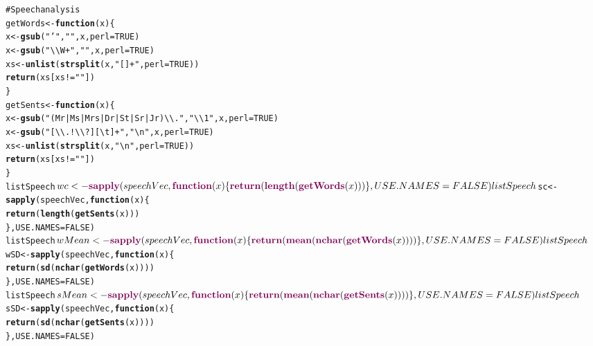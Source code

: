 \documentclass{article}\usepackage{graphicx, color}
\makeatletter
\newcommand{\hlfunctioncall}[1]{\textcolor[rgb]{0.501960784313725,0,0.329411764705882}{\textbf{#1}}}%
\newcommand{\hlstring}[1]{\textcolor[rgb]{0.6,0.6,1}{#1}}%
\newcommand{\hlcomment}[1]{\textcolor[rgb]{0.180392156862745,0.6,0.341176470588235}{#1}}%
\newenvironment{kframe}{%
 \def\at@end@of@kframe{}%
 \ifinner\ifhmode%
  \def\at@end@of@kframe{\end{minipage}}%
  \begin{minipage}{\columnwidth}%
 \fi\fi%
 \def\FrameCommand##1{\hskip\@totalleftmargin \hskip-\fboxsep
 \colorbox{shadecolor}{##1}\hskip-\fboxsep
     \hskip-\linewidth \hskip-\@totalleftmargin \hskip\columnwidth}%
 \MakeFramed {\advance\hsize-\width
   \@totalleftmargin\z@ \linewidth\hsize
   \@setminipage}}%
 {\par\unskip\endMakeFramed%
 \at@end@of@kframe}
\newenvironment{knitrout}{}{} %
\makeatother
\begin{document}
\newpage
\begin{knitrout}
\color{fgcolor}\begin{kframe}
\begin{alltt}
\hlcomment{# Speech analysis}
getWords <- \hlfunctioncall{function}(x) \{
    x <- \hlfunctioncall{gsub}(\hlstring{"'"}, \hlstring{""}, x, perl = TRUE)
    x <- \hlfunctioncall{gsub}(\hlstring{"\textbackslash{}\textbackslash{}W+"}, \hlstring{" "}, x, perl = TRUE)
    xs <- \hlfunctioncall{unlist}(\hlfunctioncall{strsplit}(x, \hlstring{"[ ]+"}, perl = TRUE))
    \hlfunctioncall{return}(xs[xs != \hlstring{""}])
\}
getSents <- \hlfunctioncall{function}(x) \{
    x <- \hlfunctioncall{gsub}(\hlstring{" (Mr|Ms|Mrs|Dr|St|Sr|Jr)\textbackslash{}\textbackslash{}."}, \hlstring{"\textbackslash{}\textbackslash{}1"}, x, perl = TRUE)
    x <- \hlfunctioncall{gsub}(\hlstring{"[\textbackslash{}\textbackslash{}.!\textbackslash{}\textbackslash{}?][ \textbackslash{}t]+"}, \hlstring{"\textbackslash{}n"}, x, perl = TRUE)
    xs <- \hlfunctioncall{unlist}(\hlfunctioncall{strsplit}(x, \hlstring{"\textbackslash{}n"}, perl = TRUE))
    \hlfunctioncall{return}(xs[xs != \hlstring{""}])
\}
listSpeech$wc <- \hlfunctioncall{sapply}(speechVec, \hlfunctioncall{function}(x) \{
    \hlfunctioncall{return}(\hlfunctioncall{length}(\hlfunctioncall{getWords}(x)))
\}, USE.NAMES = FALSE)
listSpeech$sc <- \hlfunctioncall{sapply}(speechVec, \hlfunctioncall{function}(x) \{
    \hlfunctioncall{return}(\hlfunctioncall{length}(\hlfunctioncall{getSents}(x)))
\}, USE.NAMES = FALSE)
listSpeech$wMean <- \hlfunctioncall{sapply}(speechVec, \hlfunctioncall{function}(x) \{
    \hlfunctioncall{return}(\hlfunctioncall{mean}(\hlfunctioncall{nchar}(\hlfunctioncall{getWords}(x))))
\}, USE.NAMES = FALSE)
listSpeech$wSD <- \hlfunctioncall{sapply}(speechVec, \hlfunctioncall{function}(x) \{
    \hlfunctioncall{return}(\hlfunctioncall{sd}(\hlfunctioncall{nchar}(\hlfunctioncall{getWords}(x))))
\}, USE.NAMES = FALSE)
listSpeech$sMean <- \hlfunctioncall{sapply}(speechVec, \hlfunctioncall{function}(x) \{
    \hlfunctioncall{return}(\hlfunctioncall{mean}(\hlfunctioncall{nchar}(\hlfunctioncall{getSents}(x))))
\}, USE.NAMES = FALSE)
listSpeech$sSD <- \hlfunctioncall{sapply}(speechVec, \hlfunctioncall{function}(x) \{
    \hlfunctioncall{return}(\hlfunctioncall{sd}(\hlfunctioncall{nchar}(\hlfunctioncall{getSents}(x))))
\}, USE.NAMES = FALSE)
\end{alltt}
\end{kframe}
\end{knitrout}
\end{document}
